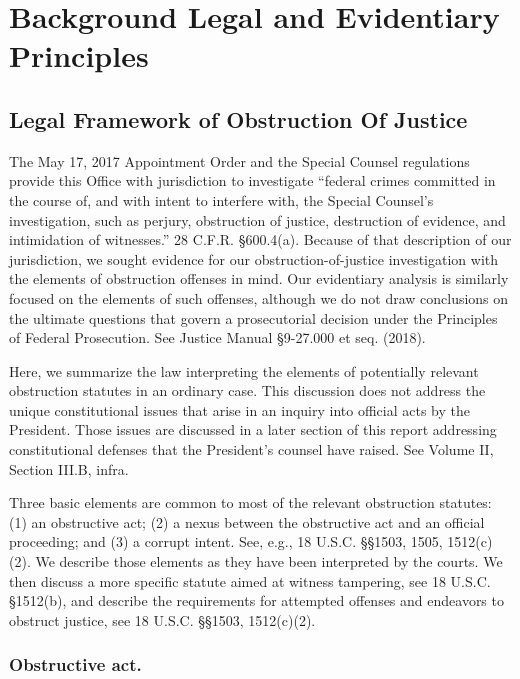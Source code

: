 \section{Background Legal and Evidentiary Principles}

\subsection{Legal Framework of Obstruction Of Justice}

The May 17, 2017 Appointment Order and the Special Counsel regulations provide this Office with jurisdiction to investigate “federal crimes committed in the course of, and with intent to interfere with, the Special Counsel's investigation, such as perjury, obstruction of justice, destruction of evidence, and intimidation of witnesses.”
28 C.F.R. \S 600.4(a).
Because of that description of our jurisdiction, we sought evidence for our obstruction-of-justice investigation with the elements of obstruction offenses in mind.
Our evidentiary analysis is similarly focused on the elements of such offenses, although we do not draw conclusions on the ultimate questions that govern a prosecutorial decision under the Principles of Federal Prosecution.
See Justice Manual \S 9-27.000 et seq. (2018).

Here, we summarize the law interpreting the elements of potentially relevant obstruction statutes in an ordinary case.
This discussion does not address the unique constitutional issues that arise in an inquiry into official acts by the President.
Those issues are discussed in a later section of this report addressing constitutional defenses that the President’s counsel have raised. See Volume II, Section III.B, infra.

Three basic elements are common to most of the relevant obstruction statutes: (1) an obstructive act; (2) a nexus between the obstructive act and an official proceeding; and (3) a corrupt intent.
See, e.g., 18 U.S.C. \S\S 1503, 1505, 1512(c)(2).
We describe those elements as they have been interpreted by the courts.
We then discuss a more specific statute aimed at witness tampering, see 18 U.S.C. \S 1512(b), and describe the requirements for attempted offenses and endeavors to obstruct justice, see 18 U.S.C. \S\S 1503, 1512(c)(2).

\subsubsection*{Obstructive act.}

